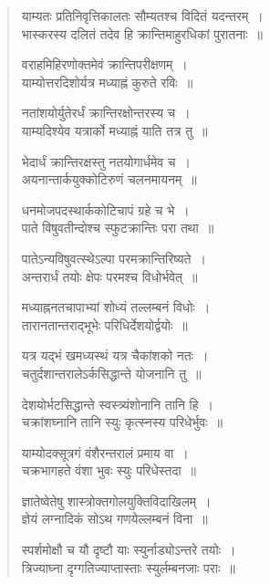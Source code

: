 \documentclass[11pt, openany]{book}
\begin{document}
\begin{quote}
{\qt याम्यतः प्रतिनिवृत्तिकालतः सौम्यतश्च विदितं यदन्तरम्~।\\
भास्करस्य दलितं तदेव हि क्रान्तिमाहुरधिकां पुरातनाः~॥
	
वराहमिहिरणोक्तमेवं क्रान्तिपरीक्षणम्~।\\
याम्योत्तरदिशोर्यत्र मध्याह्नं कुरुते रविः~॥

नतांशयोर्युतेरर्धं क्रान्तिरक्षोन्तरस्य च~।\\
याम्यदिश्येव यत्रार्को मध्याह्नं याति तत्र तु~॥

भेदार्धं क्रान्तिरक्षस्तु नतयोगार्धमेव च~।\\
अयनान्तार्कयुक्कोटिरुणं चलनमायनम्~॥
	
धनमोजपदस्थार्ककोटिचापं ग्रहे च भे~।\\
पाते विषुवतीन्दोश्च स्फुटक्रान्तिः परा तथा~॥
	
पातेऽन्यविषुवत्स्थेऽल्पा परमक्रान्तिरिष्यते~।\\
अन्तरार्धं तयोः क्षेपः परमश्च विधोर्भवेत्~॥
	
मध्याह्ननतचापाभ्यां शोध्यं तल्लम्बनं विधोः~।\\
तारानतान्तराद्भूभेः परिधिर्देशयोर्द्वयोः~॥
	
यत्र यद्भं खमध्यस्थं यत्र चैकांशको नतः~।\\
चतुर्दशान्तरालेऽर्कसिद्धान्ते योजनानि तु~॥
	
देशयोर्भटसिद्धान्ते स्वस्त्र्यंशोनानि तानि हि~।\\
चक्रांशघ्नानि तानि स्युः कृत्स्नस्य परिधेर्भुवः~॥
	
याम्योदक्सूत्रगं वंशैरन्तरालं प्रमाय वा~।\\
चक्रभागहते वंशा भुवः स्युः परिधेस्तदा~॥
	
ज्ञातेष्वेतेषु शास्त्रोक्तगोलयुक्तिविदाखिलम्~।\\
ज्ञेयं लग्नादिकं सोऽथ गणयेल्लम्बनं विना~॥
	
स्पर्शमोक्षौ च यौ दृष्टौ याः स्युर्नाड्योऽन्तरे तयोः~।\\
त्रिज्याघ्ना दृग्गतिज्याप्तास्ताः स्युर्लम्बनजाः पराः~॥}
\end{quote}
\newpage
\end{document}
